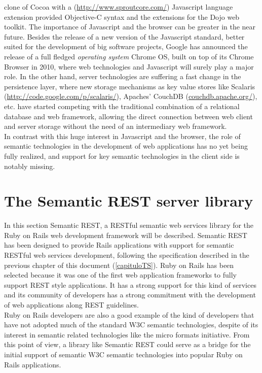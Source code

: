 clone of Cocoa with a (\url{http://www.sproutcore.com/}) Javascript language extension provided Objective-C syntax and the extensions for the Dojo web
toolkit. The importance of Javascript and the browser can be greater in the near future. Besides the release of a new
version of the Javascript standard, better suited for the development of big software projects, Google has announced the
release of a full fledged {\it operating system} Chrome OS, built on top of its Chrome Browser in 2010, where web technologies
and Javascript will surely play a major role. In the other hand, server technologies are suffering a fast change in the
persistence layer, where new storage mechanisms as key value stores like Scalaris (\url{http://code.google.com/p/scalaris/}), Apaches' CouchDB (\url{couchdb.apache.org/}), etc. have
started competing with the traditional combination of a relational database and web framework, allowing the direct
connection between web client and server storage without the need of an intermediary web framework.\\

In contrast with this huge interest in Javascript and the browser, the role of semantic technologies in the development
of web applications has no yet being fully realized, and support for key semantic technologies in the client side is
notably missing.\\

\section{The Semantic REST server library}

In this section Semantic REST,  a RESTful semantic web services library for the Ruby on Rails web development framework will be
described. Semantic REST has been designed to provide Rails applications with support for semantic RESTful web services development,
following the specification described in the previous chapter of this document (\ref{capituloTS}).
Ruby on Rails has been selected because it was one of the first web application frameworks to fully support REST style
applications. It has a strong support for this kind of services and its community of developers has a strong commitment
with the development of web applications along REST guidelines.\\
Ruby on Rails developers are also a good example of the kind of developers that have not adopted much of the standard
W3C semantic technologies, despite of its interest in semantic related technologies like the micro formats
initiative. From this point of view, a library like Semantic REST could serve as a bridge for the initial support of
semantic W3C semantic technologies into popular Ruby on Rails applications.

